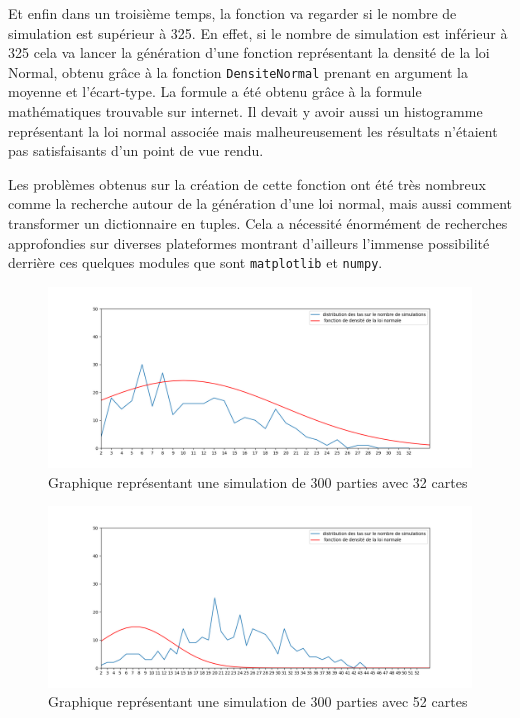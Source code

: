 \documentclass[titlepage]{article}
\begin{document}
Et enfin dans un troisième temps, la fonction va regarder si le nombre de simulation est supérieur à 325. En effet, si le nombre de simulation est inférieur à 325 cela va lancer la génération d’une fonction représentant la densité de la loi Normal, obtenu grâce à la fonction \texttt{DensiteNormal} prenant en argument la moyenne et l’écart-type. La formule a été obtenu grâce à la formule mathématiques trouvable sur internet. Il devait y avoir aussi un histogramme représentant la loi normal associée mais malheureusement les résultats n’étaient pas satisfaisants d’un point de vue rendu. \par

Les problèmes obtenus sur la création de cette fonction ont été très nombreux comme la recherche autour de la génération d’une loi normal, mais aussi comment transformer un dictionnaire en tuples. Cela a nécessité énormément de recherches approfondies sur diverses plateformes montrant d’ailleurs l’immense possibilité derrière ces quelques modules que sont \texttt{matplotlib} et \texttt{numpy}.

\begin{figure}[h]
    \centering
    \includegraphics[scale=0.5]{proba_300_32.png}
    \caption{Graphique représentant une simulation de 300 parties avec 32 cartes}
\end{figure}

\begin{figure}[h]
    \centering
    \includegraphics[scale=0.5]{proba_300_52.png}
    \caption{Graphique représentant une simulation de 300 parties avec 52 cartes}
\end{figure}
\end{document}
